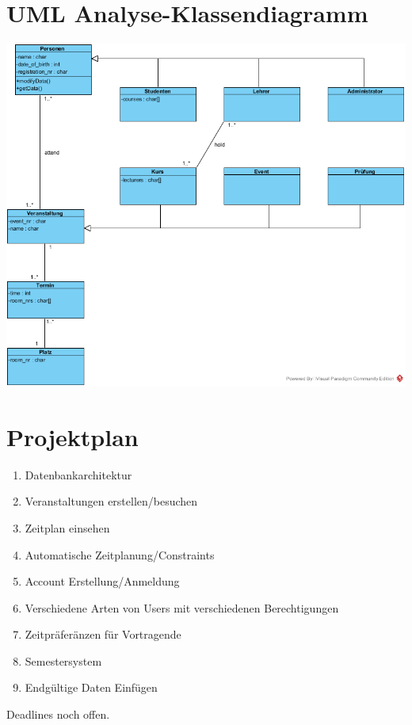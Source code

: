 \documentclass[a4paper,12pt]{article}
\begin{document}
\section*{UML Analyse-Klassendiagramm}
\begin{center}
	\includegraphics[scale=.5]{ClassDiagram.png}
\end{center}
\section*{Projektplan}
\begin{enumerate}
	\item Datenbankarchitektur
	\item Veranstaltungen erstellen/besuchen
	\item Zeitplan einsehen
	\item Automatische Zeitplanung/Constraints
	\item Account Erstellung/Anmeldung
	\item Verschiedene Arten von Users mit verschiedenen Berechtigungen
	\item Zeitpräferänzen für Vortragende
	\item Semestersystem
	\item Endgültige Daten Einfügen
\end{enumerate}
Deadlines noch offen.
\end{document}
